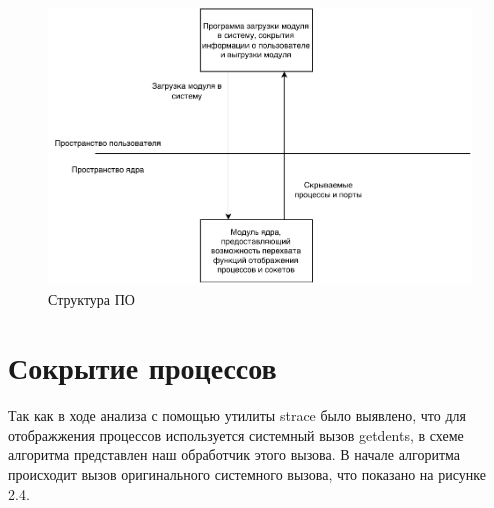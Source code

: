 \begin{figure}[H]
    \centering
    \includegraphics[scale=0.75]{pdf/struct.pdf}
    \caption{Структура ПО}\label{img:net_hide_schemee}
\end{figure}

\section{Сокрытие процессов}%
\label{sec:skrytie_protsessov}

Так как в ходе анализа с помощью утилиты strace было выявлено,
что для отображжения процессов используется системный вызов getdents,
в схеме алгоритма представлен наш обработчик этого вызова. В начале
алгоритма происходит вызов оригинального системного вызова, что показано
на рисунке 2.4.

